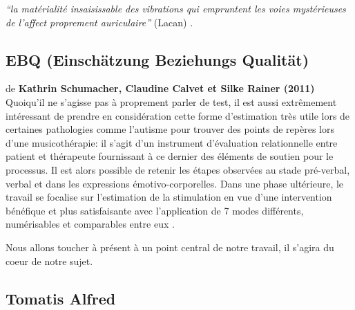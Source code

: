 \textsf{\textit{``la matérialité insaisissable
  des vibrations qui empruntent  les voies mystérieuses de
l'affect proprement auriculaire''}
(Lacan)}
\autocite[ch. 13]{auriol:cle}.





\subsection{EBQ (Einschätzung Beziehungs Qualität)}
de \textbf{Kathrin Schumacher, Claudine Calvet et Silke Rainer (2011)}
Quoiqu'il ne s'agisse pas à proprement parler de test, il est aussi
extrêmement intéressant de prendre en  considération cette forme
d'estimation très
utile lors de certaines pathologies comme l'autisme pour trouver des
points de repères lors d'une musicothérapie: il s'agit d'un instrument d'évaluation relationnelle entre patient et
thérapeute fournissant à ce dernier des éléments de soutien pour le
processus.
Il est alors possible de retenir les étapes
observées au stade pré-verbal, verbal et dans les expressions
émotivo-corporelles.
Dans une phase ultérieure, le travail se focalise sur l'estimation de
la stimulation en vue d'une intervention bénéfique et plus
satisfaisante avec l'application de 7 modes différents, numérisables
et comparables entre eux \autocite{EBQ-key}.

Nous allons toucher à présent à un point central de notre travail, il
s'agira du coeur de notre sujet.
  
\subsection{Tomatis Alfred}

